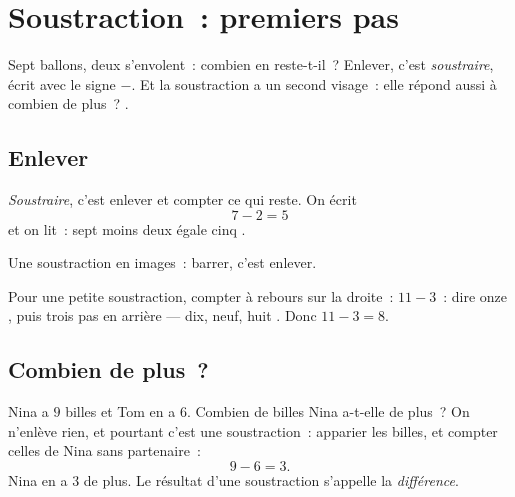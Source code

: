 \chapter{Soustraction~: premiers pas}\label{ch:g1:subtraction}

Sept ballons, deux s'envolent~: combien en reste-t-il~? Enlever,
c'est \emph{soustraire}, écrit avec le signe $-$. Et la soustraction
a un second visage~: elle répond aussi à \guillemotleft{} combien
de plus~? \guillemotright{}.

\section{Enlever}

\begin{definition}[Soustraction]\label{def:g1:subtraction:def}
\emph{Soustraire}, c'est enlever et compter ce qui reste. On écrit
\[
7 - 2 = 5
\]
et on lit~: \guillemotleft{} sept moins deux égale cinq
\guillemotright{}.
\end{definition}

\begin{omfigure}

{\small Une soustraction en images~: barrer, c'est enlever.}
\end{omfigure}

\begin{example}\label{ex:g1:subtraction:countback}
Pour une petite soustraction, compter à rebours sur la droite~:
$11 - 3$~: dire \guillemotleft{} onze \guillemotright{}, puis trois
pas en arrière --- \guillemotleft{} dix, neuf, huit
\guillemotright{}. Donc $11 - 3 = 8$.
\end{example}

\section{Combien de plus~?}

\begin{example}[La différence]\label{ex:g1:subtraction:difference}
\guillemotleft{} Nina a $9$ billes et Tom en a $6$. Combien de billes
Nina a-t-elle de plus~? \guillemotright{} On n'enlève rien, et
pourtant c'est une soustraction~: apparier les billes, et compter
celles de Nina sans partenaire~:
\[
9 - 6 = 3 .
\]
Nina en a $3$ de plus. Le résultat d'une soustraction s'appelle la
\emph{différence}.
\end{example}


